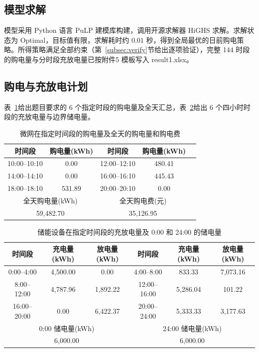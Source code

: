 \documentclass[zihao=-4,a4paper,UTF8,fontset=none]{ctexart}
\begin{document}
\subsection{模型求解}

模型采用 Python 语言 PuLP 建模库构建，调用开源求解器 HiGHS 求解。求解状态为 Optimal，目标值有限，求解耗时约 $0.01$ 秒，得到全局最优的日前购电策略。所得策略满足全部约束（第~\ref{subsec:verify}节给出逐项验证），完整 144 时段的购电量与分时段充放电量已按附件5 模板写入 result1.xlsx。

\subsection{购电与充放电计划}

表~\ref{tab:q1_table1}给出题目要求的 6 个指定时段的购电量及全天汇总，表~\ref{tab:q1_table2}给出 6 个四小时时段的充放电量与边界储电量。

\begin{table}[H]
  \centering
  \caption{微网在指定时间段的购电量及全天的购电量和购电费}
  \label{tab:q1_table1}
  \begin{tabular}{ccccc}
    \toprule
    时间段 & 购电量(kWh) & 时间段 & 购电量(kWh) \\
    \midrule
    10:00--10:10 & 0.00 & 12:00--12:10 & 480.41 \\
    14:00--14:10 & 0.00 & 16:00--16:10 & 445.43 \\
    18:00--18:10 & 531.89 & 20:00--20:10 & 0.00 \\
    \midrule
    \multicolumn{2}{c}{全天购电量(kWh)} & \multicolumn{2}{c}{全天购电费(元)} \\
    \multicolumn{2}{c}{59,482.70} & \multicolumn{2}{c}{35,126.95} \\
    \bottomrule
  \end{tabular}
\end{table}

\begin{table}[H]
  \centering
  \caption{储能设备在指定时间段的充放电量及 0:00 和 24:00 的储电量}
  \label{tab:q1_table2}
  \small
  \begin{tabular}{cccccc}
    \toprule
    时间段 & 充电量(kWh) & 放电量(kWh) & 时间段 & 充电量(kWh) & 放电量(kWh) \\
    \midrule
    0:00--4:00 & 4,500.00 & 0.00 & 4:00--8:00 & 833.33 & 7,073.16 \\
    8:00--12:00 & 4,787.96 & 1,892.22 & 12:00--16:00 & 5,286.04 & 101.22 \\
    16:00--20:00 & 0.00 & 6,422.37 & 20:00--24:00 & 5,333.33 & 3,177.63 \\
    \midrule
    \multicolumn{3}{c}{0:00 储电量(kWh)} & \multicolumn{3}{c}{24:00 储电量(kWh)} \\
    \multicolumn{3}{c}{6,000.00} & \multicolumn{3}{c}{6,000.00} \\
    \bottomrule
  \end{tabular}
\end{table}
\end{document}
